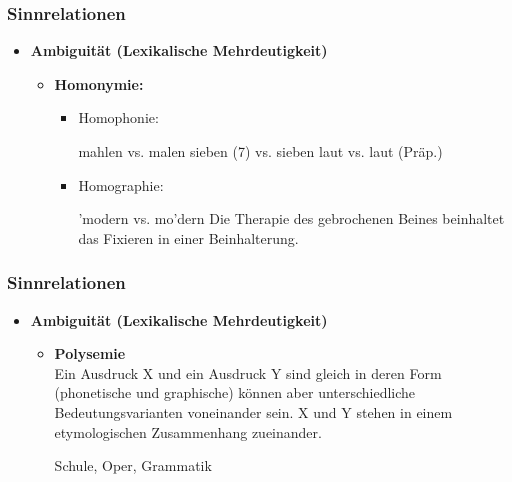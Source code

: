 \begin{frame}
\frametitle{Sinnrelationen}

\begin{itemize}
	\item \textbf{Ambiguität (Lexikalische Mehrdeutigkeit)}

\vspace{1em}

	\begin{itemize}
		\item \textbf{Homonymie:}
		
		\begin{itemize}
			\item Homophonie:
			
			\eal
			\ex mahlen vs. malen 
			\ex sieben (7) vs. sieben
			\ex laut vs. laut (Präp.)
			\zl
			
			\item Homographie:
					
			\eal 
			\ex 'modern vs. mo'dern
			\ex Die Therapie des gebrochenen Beines beinhaltet das Fixieren in einer Beinhalterung.
			\zl
			
		\end{itemize}
		
	\end{itemize}
\end{itemize}

\end{frame}



\begin{frame}
\frametitle{Sinnrelationen}

\begin{itemize}
	\item \textbf{Ambiguität (Lexikalische Mehrdeutigkeit)}
	
\vspace{1em}

	\begin{itemize}
		\item \textbf{Polysemie}\\
Ein Ausdruck X und ein Ausdruck Y sind gleich in deren Form (phonetische und graphische) können aber unterschiedliche Bedeutungsvarianten voneinander sein. X und Y stehen in einem etymologischen Zusammenhang zueinander.

		\ea Schule, Oper, Grammatik
		\z

	\end{itemize}
	
\end{itemize}

\end{frame}


